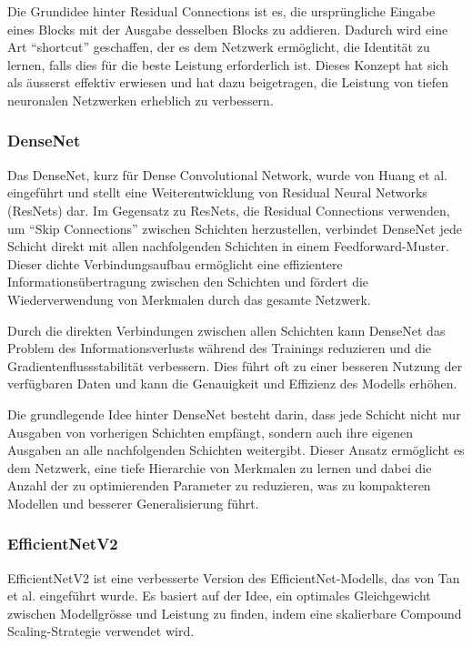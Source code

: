 Die Grundidee hinter Residual Connections ist es, die ursprüngliche Eingabe eines Blocks mit der Ausgabe desselben Blocks zu addieren. Dadurch wird eine Art "`shortcut"' geschaffen, der es dem Netzwerk ermöglicht, die Identität zu lernen, falls dies für die beste Leistung erforderlich ist. Dieses Konzept hat sich als äusserst effektiv erwiesen und hat dazu beigetragen, die Leistung von tiefen neuronalen Netzwerken erheblich zu verbessern.

\subsubsection{DenseNet}
Das DenseNet, kurz für Dense Convolutional Network, wurde von Huang et al. \cite{huang_densely_2018} eingeführt und stellt eine Weiterentwicklung von Residual Neural Networks (ResNets) dar. Im Gegensatz zu ResNets, die Residual Connections verwenden, um "`Skip Connections"' zwischen Schichten herzustellen, verbindet DenseNet jede Schicht direkt mit allen nachfolgenden Schichten in einem Feedforward-Muster. Dieser dichte Verbindungsaufbau ermöglicht eine effizientere Informationsübertragung zwischen den Schichten und fördert die Wiederverwendung von Merkmalen durch das gesamte Netzwerk.

Durch die direkten Verbindungen zwischen allen Schichten kann DenseNet das Problem des Informationsverlusts während des Trainings reduzieren und die Gradientenflussstabilität verbessern. Dies führt oft zu einer besseren Nutzung der verfügbaren Daten und kann die Genauigkeit und Effizienz des Modells erhöhen.

Die grundlegende Idee hinter DenseNet besteht darin, dass jede Schicht nicht nur Ausgaben von vorherigen Schichten empfängt, sondern auch ihre eigenen Ausgaben an alle nachfolgenden Schichten weitergibt. Dieser Ansatz ermöglicht es dem Netzwerk, eine tiefe Hierarchie von Merkmalen zu lernen und dabei die Anzahl der zu optimierenden Parameter zu reduzieren, was zu kompakteren Modellen und besserer Generalisierung führt.

\subsubsection{EfficientNetV2}
EfficientNetV2 ist eine verbesserte Version des EfficientNet-Modells, das von Tan et al. \cite{tan_efficientnetv2_2021} eingeführt wurde. Es basiert auf der Idee, ein optimales Gleichgewicht zwischen Modellgrösse und Leistung zu finden, indem eine skalierbare Compound Scaling-Strategie verwendet wird.

